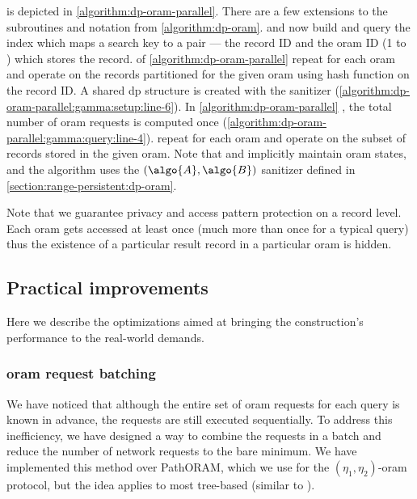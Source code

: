 		\protocolGamma{} is depicted in \cref{algorithm:dp-oram-parallel}.
		There are a few extensions to the subroutines and notation from \cref{algorithm:dp-oram}.
		 and  now build and query the index which maps a search key to a pair --- the record ID and the \acrshort{oram} ID (1 to \oramsNumber{}) which stores the record.
		 of \cref{algorithm:dp-oram-parallel} \protocolSetup{} repeat for each \acrshort{oram} and operate on the records partitioned for the given \acrshort{oram} using hash function  on the record ID\@.
		A shared \acrshort{dp} structure is created with the sanitizer  (\cref{algorithm:dp-oram-parallel:gamma:setup:line-6}).
		In \cref{algorithm:dp-oram-parallel} \protocolQuery{}, the total number of \acrshort{oram} requests is computed once (\cref{algorithm:dp-oram-parallel:gamma:query:line-4}).
		 repeat for each \acrshort{oram} and operate on the subset of records stored in the given \acrshort{oram}.
		Note that \user{} and \server{} implicitly maintain \oramsNumber{} \acrshort{oram} states, and the algorithm uses the $(\algo{A}, \algo{B})$ sanitizer defined in \cref{section:range-persistent:dp-oram}.

		Note that we guarantee privacy and access pattern protection on a record level.
		Each \acrshort{oram} gets accessed at least once (much more than once for a typical query) thus the existence of a particular result record in a particular \acrshort{oram} is hidden.

	\subsection{Practical improvements}\label{section:range-persistent:dp-improvements}

		Here we describe the optimizations aimed at bringing the construction's performance to the real-world demands.

		\subsubsection{\texorpdfstring{\acrshort{oram}}{ORAM} request batching}\label{section:range-persistent:dp-improvements:oram-batching}

			We have noticed that although the entire set of \acrshort{oram} requests for each query is known in advance, the requests are still executed sequentially.
			To address this inefficiency, we have designed a way to combine the requests in a batch and reduce the number of network requests to the bare minimum.
			We have implemented this method over PathORAM, which we use for the $(\eta_1, \eta_2)$-\acrshort{oram} protocol, but the idea applies to most tree-based  (similar to \cite{parallel-oram-improved}).

